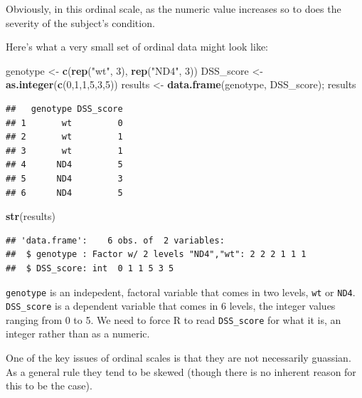 \documentclass[]{book}
\newenvironment{Shaded}{\begin{snugshade}}{\end{snugshade}}
\newcommand{\DecValTok}[1]{\textcolor[rgb]{0.00,0.00,0.81}{#1}}
\newcommand{\KeywordTok}[1]{\textcolor[rgb]{0.13,0.29,0.53}{\textbf{#1}}}
\newcommand{\NormalTok}[1]{#1}
\newcommand{\StringTok}[1]{\textcolor[rgb]{0.31,0.60,0.02}{#1}}
\begin{document}
Obviously, in this ordinal scale, as the numeric value increases so to does the severity of the subject's condition.

Here's what a very small set of ordinal data might look like:

\begin{Shaded}
\begin{Highlighting}[]
\NormalTok{genotype <-}\StringTok{ }\KeywordTok{c}\NormalTok{(}\KeywordTok{rep}\NormalTok{(}\StringTok{"wt"}\NormalTok{, }\DecValTok{3}\NormalTok{), }\KeywordTok{rep}\NormalTok{(}\StringTok{"ND4"}\NormalTok{, }\DecValTok{3}\NormalTok{))}
\NormalTok{DSS_score <-}\StringTok{ }\KeywordTok{as.integer}\NormalTok{(}\KeywordTok{c}\NormalTok{(}\DecValTok{0}\NormalTok{,}\DecValTok{1}\NormalTok{,}\DecValTok{1}\NormalTok{,}\DecValTok{5}\NormalTok{,}\DecValTok{3}\NormalTok{,}\DecValTok{5}\NormalTok{))}
\NormalTok{results <-}\StringTok{ }\KeywordTok{data.frame}\NormalTok{(genotype, DSS_score); results}
\end{Highlighting}
\end{Shaded}

\begin{verbatim}
##   genotype DSS_score
## 1       wt         0
## 2       wt         1
## 3       wt         1
## 4      ND4         5
## 5      ND4         3
## 6      ND4         5
\end{verbatim}

\begin{Shaded}
\begin{Highlighting}[]
\KeywordTok{str}\NormalTok{(results)}
\end{Highlighting}
\end{Shaded}

\begin{verbatim}
## 'data.frame':    6 obs. of  2 variables:
##  $ genotype : Factor w/ 2 levels "ND4","wt": 2 2 2 1 1 1
##  $ DSS_score: int  0 1 1 5 3 5
\end{verbatim}

\texttt{genotype} is an indepedent, factoral variable that comes in two levels, \texttt{wt} or \texttt{ND4}. \texttt{DSS\_score} is a dependent variable that comes in 6 levels, the integer values ranging from 0 to 5. We need to force R to read \texttt{DSS\_score} for what it is, an integer rather than as a numeric.

One of the key issues of ordinal scales is that they are not necessarily guassian. As a general rule they tend to be skewed (though there is no inherent reason for this to be the case).
\end{document}
